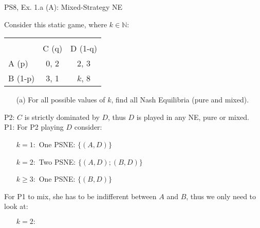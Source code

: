 \begin{frame}{PS8, Ex. 1.a (A): Mixed-Strategy NE}
    \begin{multicols}{2}
      Consider this static game, where $k\in\mathbb{N}:$
      \vspace{-16pt}
      \begin{table}
        \begin{tabular}{l|c|c|}
          \multicolumn{1}{c}{} & \multicolumn{2}{c}{} \\
          \multicolumn{1}{c}{} & \multicolumn{1}{c}{C (q)} & \multicolumn{1}{c}{\color{blue}D (1-q)} \\\cline{2-3}
          A (p)   & 0, 2 & 2, \color{blue}3 \\\cline{2-3}
          B (1-p) & 3, 1 & $k$, \color{blue}8 \\\cline{2-3}
        \end{tabular}
      \end{table}
      \begin{itemize}
        \item[(a)] For all possible values of $k$, find all Nash Equilibria (pure and mixed).
      \end{itemize}
      P2: $C$ is strictly dominated by $D$, thus $D$ is played in any NE, pure or mixed.\\\medskip
      P1: For P2 playing $D$ consider:
      \begin{itemize}
        \item[$k=1:$] One PSNE: $\{(A,D)\}$
        \item[$k=2:$] Two PSNE: $\{(A,D);(B,D)\}$
        \item[$k\geq3:$] One PSNE: $\{(B,D)\}$
      \end{itemize}
      For P1 to mix, she has to be indifferent between $A$ and $B$, thus we only need to look at:
      \begin{itemize}
        \item[$k=2:$]
      \end{itemize}
      \vfill\null\columnbreak
      \vfill\null
    \end{multicols}
\end{frame}

